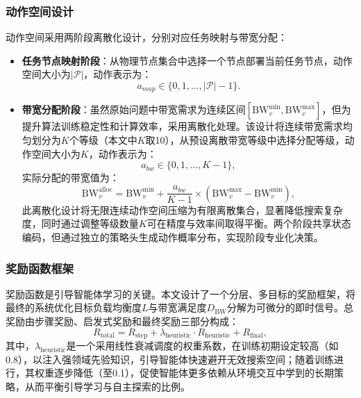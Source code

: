 \subsubsection{动作空间设计}
动作空间采用两阶段离散化设计，分别对应任务映射与带宽分配：
\begin{itemize}
    \item \textbf{任务节点映射阶段}：从物理节点集合中选择一个节点部署当前任务节点，动作空间大小为$|\mathcal{P}|$，动作表示为：
        \begin{equation}
        a_{map} \in \{0, 1, \dots, |\mathcal{P}|-1\}.
        \end{equation}
    \item \textbf{带宽分配阶段}：虽然原始问题中带宽需求为连续区间$[\text{BW}_v^{\min}, \text{BW}_v^{\max}]$，但为提升算法训练稳定性和计算效率，采用离散化处理。该设计将连续带宽需求均匀划分为$K$个等级（本文中$K$取10），从预设离散带宽等级中选择分配等级，动作空间大小为$K$，动作表示为：
        \begin{equation}
        a_{bw} \in \{0, 1, \dots, K-1\},
        \end{equation}
    实际分配的带宽值为：
        \begin{equation}
        \text{BW}_v^{\text{alloc}} = \text{BW}_v^{\min} + \frac{a_{bw}}{K-1} \times (\text{BW}_v^{\max} - \text{BW}_v^{\min}),
        \end{equation}
    此离散化设计将无限连续动作空间压缩为有限离散集合，显著降低搜索复杂度，同时通过调整等级数量$K$可在精度与效率间取得平衡。两个阶段共享状态编码，但通过独立的策略头生成动作概率分布，实现阶段专业化决策。
\end{itemize}

\subsubsection{奖励函数框架}
奖励函数是引导智能体学习的关键。本文设计了一个分层、多目标的奖励框架，将最终的系统优化目标负载均衡度$L$与带宽满足度$D_{\text{BW}}$分解为可微分的即时信号。总奖励由步骤奖励、启发式奖励和最终奖励三部分构成：
\begin{equation}
R_{\text{total}} = R_{\text{step}} + \lambda_{\text{heuristic}} \cdot R_{\text{heuristic}} + R_{\text{final}},
\end{equation}
其中，$\lambda_{\text{heuristic}}$是一个采用线性衰减调度的权重系数，在训练初期设定较高（如0.8），以注入强领域先验知识，引导智能体快速避开无效搜索空间；随着训练进行，其权重逐步降低（至0.1），促使智能体更多依赖从环境交互中学到的长期策略，从而平衡引导学习与自主探索的比例。


